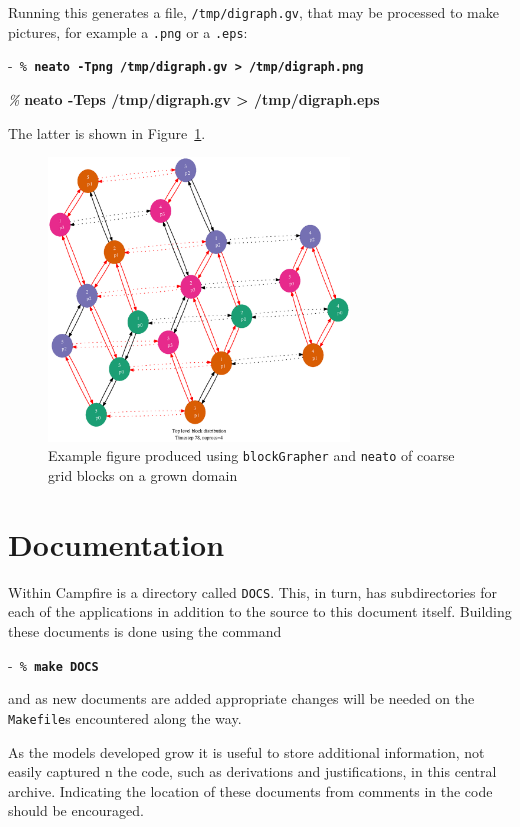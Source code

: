 \documentclass[paper=a4, fontsize=11pt,twoside,bibtotoc]{scrartcl}		%
\newenvironment{codebox}{\begin{center}\begin{MakeFramed}{\hsize0.99\linewidth\advance\hsize-\width\FrameRestore}\tt}{\end{MakeFramed}\end{center}}
\newcommand{\prompt}[1]{\textsl{\%} \textbf{#1}}
\begin{document}
Running this generates a file, \texttt{/tmp/digraph.gv}, that may be processed to make pictures, for example a \texttt{.png} or a \texttt{.eps}:
\begin{codebox}
	\prompt{neato -Tpng /tmp/digraph.gv > /tmp/digraph.png}

	\prompt{neato -Teps /tmp/digraph.gv > /tmp/digraph.eps}
\end{codebox}
The latter is shown in Figure~\ref{FIG_digraph}.
\begin{figure}
	\centering
	\includegraphics[width=8.0cm]{digraph.eps}
	\caption{Example figure produced using \texttt{blockGrapher} and \texttt{neato} of coarse grid blocks on a grown domain}
	\label{FIG_digraph}
\end{figure}


\section{Documentation}
								\label{SEC_Documentation}

Within Campfire is a directory called \texttt{DOCS}.  This, in turn, has subdirectories for each of the applications in addition to the source to this document 
itself.  
Building these documents is done using the command
\begin{codebox}
	\prompt{make DOCS}
\end{codebox}
and as new documents are added appropriate changes will be needed on the \texttt{Makefile}s encountered along the way.

As the models developed grow it is useful to store additional information, not easily captured n the code, such as derivations and justifications, in this 
central archive.  Indicating the location of these documents from comments in the code should be encouraged.
\end{document}
